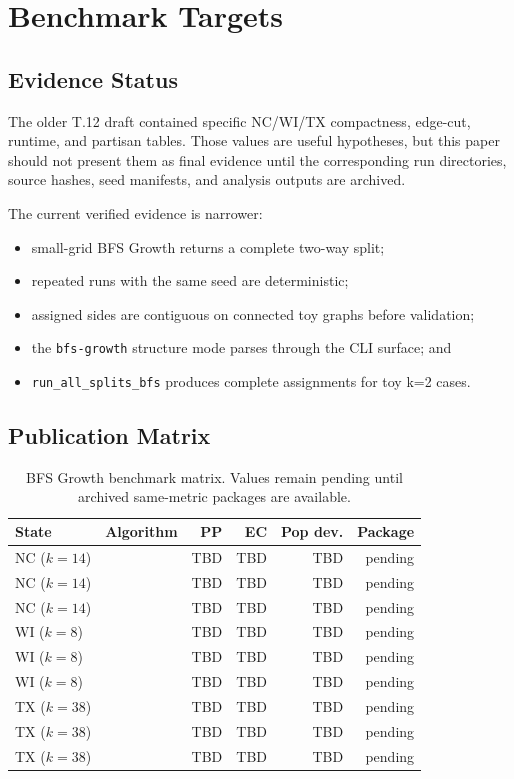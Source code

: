 \section{Benchmark Targets}
\label{sec:comparison}

\subsection{Evidence Status}

The older T.12 draft contained specific NC/WI/TX compactness, edge-cut, runtime,
and partisan tables. Those values are useful hypotheses, but this paper should
not present them as final evidence until the corresponding run directories,
source hashes, seed manifests, and analysis outputs are archived.

The current verified evidence is narrower:
\begin{itemize}
\item small-grid BFS Growth returns a complete two-way split;
\item repeated runs with the same seed are deterministic;
\item assigned sides are contiguous on connected toy graphs before validation;
\item the \texttt{bfs-growth} structure mode parses through the CLI surface; and
\item \texttt{run\_all\_splits\_bfs} produces complete assignments for toy k=2 cases.
\end{itemize}

\subsection{Publication Matrix}

\begin{table}[t]
\centering
\caption{BFS Growth benchmark matrix. Values remain pending until archived
same-metric packages are available.}
\label{tab:main-comparison}
\renewcommand{\arraystretch}{1.2}
\begin{tabular}{llrrrr}
\toprule
State & Algorithm & PP & EC & Pop dev. & Package \\
\midrule
NC ($k=14$) & \bfsg{}  & TBD & TBD & TBD & pending \\
NC ($k=14$) & \metis{} & TBD & TBD & TBD & pending \\
NC ($k=14$) & \cvd{}   & TBD & TBD & TBD & pending \\
\midrule
WI ($k=8$) & \bfsg{}  & TBD & TBD & TBD & pending \\
WI ($k=8$) & \metis{} & TBD & TBD & TBD & pending \\
WI ($k=8$) & \cvd{}   & TBD & TBD & TBD & pending \\
\midrule
TX ($k=38$) & \bfsg{}  & TBD & TBD & TBD & pending \\
TX ($k=38$) & \metis{} & TBD & TBD & TBD & pending \\
TX ($k=38$) & \cvd{}   & TBD & TBD & TBD & pending \\
\bottomrule
\end{tabular}
\end{table}

